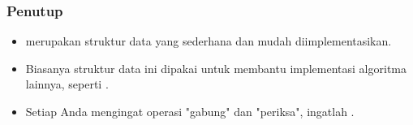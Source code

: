 \begin{frame}
\frametitle{Penutup}
\begin{itemize}
  \item \pDjs merupakan struktur data yang sederhana dan mudah diimplementasikan.
  \item Biasanya struktur data ini dipakai untuk membantu implementasi algoritma lainnya, seperti .
  \item Setiap Anda mengingat operasi "gabung" dan "periksa", ingatlah \pdjs.
\end{itemize}
\end{frame}




